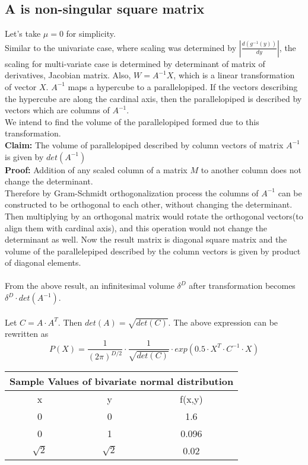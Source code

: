 \documentclass{article}
\begin{document}
\subsection{A is non-singular square matrix}
Let's take $\mu = 0$ for simplicity.\\
Similar to the univariate case, where scaling was determined by $\left|\frac{d(g^{-1}(y))}{dy}\right|$, the scaling for multi-variate case is determined by determinant of matrix of derivatives, Jacobian matrix.
Also, $W=A^{-1}X$, which is a linear transformation of vector $X$. $A^{-1}$ maps a hypercube to a parallelopiped. If the vectors describing the hypercube are along the cardinal axis, then the parallelopiped is described by vectors which are columns of $A^{-1}$.\\
We intend to find the volume of the parallelopiped formed due to this transformation.\\
\textbf{Claim: }The volume of parallelopiped described by column vectors of matrix $A^{-1}$ is given by $det({A^{-1}})$\\
\textbf{Proof: }Addition of any scaled column of a matrix $M$ to another column does not change the determinant.\\
Therefore by Gram-Schmidt orthogonalization process the columns of $A^{-1}$ can be constructed to be orthogonal to each other, without changing the determinant. Then multiplying by an orthogonal matrix would rotate the orthogonal vectors(to align them with cardinal axis), and this operation would not change the determinant as well. Now the result matrix is diagonal square matrix and the volume of the parallelepiped described by the column vectors is given by product of diagonal elements.\\
\\
From the above result, an infinitesimal volume $\delta^{D}$ after transformation becomes $\delta^{D} \cdot det(A^{-1})$.\\
\\
Let $C=A \cdot A^T$. Then $det(A) = \sqrt{det(C)}$. The above expression can be rewritten as
\begin{equation}
    P(X) = \frac{1}{(2\pi)^{D/2}}\cdot \frac{1}{\sqrt{det(C)}} \cdot exp(0.5 \cdot X^T \cdot C^{-1} \cdot X)
\end{equation}
\begin{tabular}{|c|c||c|}
\hline
\multicolumn{3}{|c|}{Sample Values of bivariate normal distribution}\\
\hline
x & y & f(x,y)\\
\hline
 0 & 0   &  1.6\\
0   &  1 & 0.096 \\
$\sqrt{2}$ & $\sqrt{2}$ & 0.02 \\
\hline
\end{tabular}

\printbibliography
\end{document}
